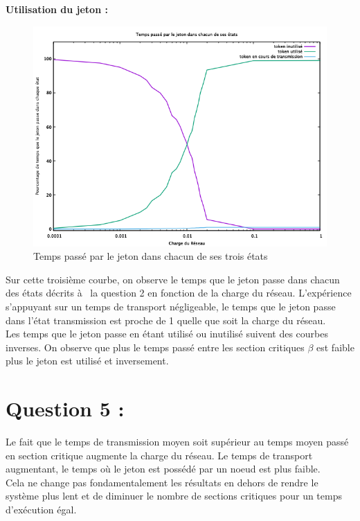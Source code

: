 \documentclass[11pt,a4paper]{report}
\begin{document}
\textbf{Utilisation du jeton :}

\begin{figure}
	\begin{center}
		\includegraphics[scale=0.6]{Temps_token.png}
	\end{center}
	\caption{\label{Temps_token} Temps passé par le jeton dans chacun de ses trois états}
\end{figure}

Sur cette troisième courbe, on observe le temps que le jeton passe dans chacun des états décrits à  la question 2 en fonction de la charge du réseau. L'expérience s'appuyant sur un temps de transport négligeable, le temps que le jeton passe dans l'état transmission est proche de 1 quelle que soit la charge du réseau.\\

Les temps que le jeton passe en étant utilisé ou inutilisé suivent des courbes inverses. On observe que plus le temps passé entre les section critiques $\beta$ est faible plus le jeton est utilisé et inversement.


\section{Question 5 :}

Le fait que le temps de transmission moyen soit supérieur au temps moyen passé en section critique augmente la charge du réseau. Le temps de transport augmentant, le temps où le jeton est possédé par un noeud est plus faible.\\

Cela ne change pas fondamentalement les résultats en dehors de rendre le système plus lent et de diminuer le nombre de sections critiques pour un temps d'exécution égal.\\
\end{document}
